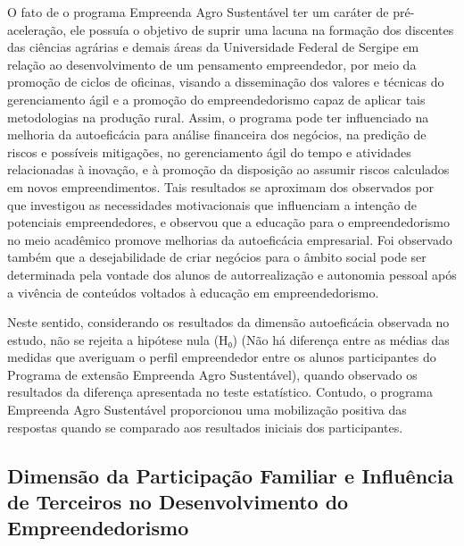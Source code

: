 O fato de o programa Empreenda Agro Sustentável ter um caráter de pré-aceleração, ele possuía o objetivo de suprir uma lacuna na formação dos discentes das ciências agrárias e demais áreas da Universidade Federal de Sergipe em relação ao desenvolvimento de um pensamento empreendedor, por meio da promoção de ciclos de oficinas, visando a disseminação dos valores e técnicas do gerenciamento ágil e a promoção do empreendedorismo capaz de aplicar tais metodologias na produção rural. Assim, o programa pode ter influenciado na melhoria da autoeficácia para análise financeira dos negócios, na predição de riscos e possíveis mitigações, no gerenciamento ágil do tempo e atividades relacionadas à inovação, e à promoção da disposição ao assumir riscos calculados em novos empreendimentos. Tais resultados se aproximam dos observados por  que investigou as necessidades motivacionais que influenciam a intenção de potenciais empreendedores, e observou que a educação para o empreendedorismo no meio acadêmico promove melhorias da autoeficácia empresarial. Foi observado também que a desejabilidade de criar negócios para o âmbito social pode ser determinada pela vontade dos alunos de autorrealização e autonomia pessoal após a vivência de conteúdos voltados à educação em empreendedorismo.

Neste sentido, considerando os resultados da dimensão autoeficácia observada no estudo, não se rejeita a hipótese nula (H₀) (Não há diferença entre as médias das medidas que averiguam o perfil empreendedor entre os alunos participantes do Programa de extensão Empreenda Agro Sustentável), quando observado os resultados da diferença apresentada no teste estatístico. Contudo, o programa Empreenda Agro Sustentável proporcionou uma mobilização positiva das respostas quando se comparado aos resultados iniciais dos participantes.


\subsection{Dimensão da Participação Familiar e Influência de Terceiros no Desenvolvimento do Empreendedorismo}

